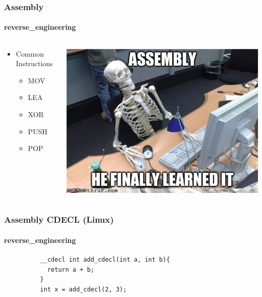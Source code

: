 \documentclass[aspectratio=169]{beamer}
\begin{document}
\begin{frame}
  \frametitle{Assembly}
  \framesubtitle{reverse\_engineering}
  \begin{columns}
    \begin{column}{.35\textwidth}
      \begin{itemize}
      \item{Common Instructions}
        \begin{itemize}
        \item{MOV}
        \item{LEA}
        \item{XOR}
        \item{PUSH}
        \item{POP}
      \end{itemize}
    \end{itemize}
    \end{column}
    \hfill
    \begin{column}{0.65\textwidth}
      \begin{center}
        \includegraphics[scale=0.40]{assembly-meme}
      \end{center}
    \end{column}
  \end{columns}
\end{frame}

\begin{frame}[fragile]{}
  \frametitle{Assembly CDECL (Linux)}
  \framesubtitle{reverse\_engineering}
  \begin{center}
    \begin{tcolorbox}[title=cdecl.c,colback=black]
        \begin{verbatim}
          __cdecl int add_cdecl(int a, int b){
            return a + b;
          }
          int x = add_cdecl(2, 3);
        \end{verbatim}
    \end{tcolorbox}
  \end{center}
\end{frame}
\end{document}
